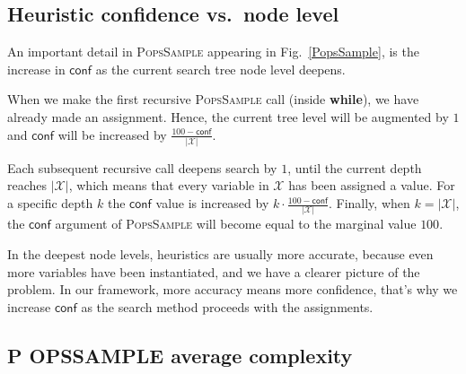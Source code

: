 \documentclass{ws-ijait}
\begin{document}
\subsection{Heuristic confidence vs.\ node level}

An important detail in \textsc{PopsSample} appearing in
Fig.~\ref{PopsSample}, is the increase in $\mathsf{conf}$ as
the current search tree node level deepens.

When we make the first recursive \textsc{PopsSample} call
(inside \textbf{while}), we have already made an assignment.
Hence, the current tree level will be augmented by $1$ and
$\mathsf{conf}$ will be increased by $\frac{100 -
\mathsf{conf}}{|\mathscr{X}|}$.

Each subsequent recursive call deepens search by $1$, until
the current depth reaches $|\mathscr{X}|$, which means that
every variable in $\mathscr{X}$ has been assigned a value.
For a specific depth $k$ the $\mathsf{conf}$ value is
increased by $k \cdot \frac{100 -
\mathsf{conf}}{|\mathscr{X}|}$. Finally, when $k =
|\mathscr{X}|$, the $\mathsf{conf}$ argument of
\textsc{PopsSample} will become equal to the marginal value
$100$.

In the deepest node levels, heuristics are usually more
accurate, because even more variables have been
instantiated, and we have a clearer picture of the problem.
In our framework, more accuracy means more confidence,
that's why we increase $\mathsf{conf}$ as the search method
proceeds with the assignments.

\newcommand{\PoPS}{\textbf{\normalsize P\footnotesize
                           O\normalsize PS}}
\newcommand{\PopsSample}{\textbf{\normalsize P\footnotesize
                       OPS\normalsize S\footnotesize AMPLE}}

\subsection{\PopsSample{} average complexity}
\end{document}
